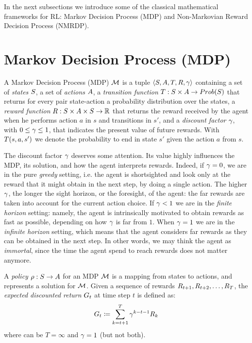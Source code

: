 In the next subsections we introduce some of the classical mathematical frameworks for RL: Markov Decision Process (MDP) and Non-Markovian Reward Decision Process (NMRDP).
\section{Markov Decision Process (MDP)}
\label{MDP}

A Markov Decision Process (MDP) $\mathcal{M}$ is a tuple $\langle S, A, T, R, \gamma \rangle$ containing a set of \emph{states} $S$, a set of \emph{actions} $A$, a \emph{transition function} $T: S \times A \to Prob(S)$ that returns for every pair state-action a probability distribution over the states, a \emph{reward function} $R: S \times A \times S \to \mathbb{R}$ that returns the reward received by the agent when he performs action $a$ in $s$ and transitions in $s'$, and a \emph{discount factor} $\gamma$, with $0 \le \gamma \le 1$, that indicates the present value of future rewards. With $T(s, a, s')$ we denote the probability to end in state $s'$ given the action $a$ from $s$.

The discount factor $\gamma$ deserves some attention. Its value highly influences the MDP, its solution, and how the agent interprets rewards. Indeed, if $\gamma = 0$, we are in the pure \emph{greedy} setting, i.e. the agent is shortsighted and look only at the reward that it might obtain in the next step, by doing a single action. The higher $\gamma$, the longer the sight horizon, or the foresight, of the agent: the far rewards are taken into account for the  current action choice. If $\gamma < 1$ we are in the \emph{finite horizon} setting: namely, the agent is intrinsically motivated to obtain rewards as fast as possible, depending on how $\gamma$ is far from $1$. When $\gamma = 1$ we are in the \emph{infinite horizon} setting, which means that the agent considers far rewards as they can be obtained in the next step. In other words, we may think the agent as \emph{immortal}, since the time the agent spend to reach rewards does not matter anymore.

\medskip
A \emph{policy} $\rho: S \to A$ for an MDP $\mathcal{M}$ is a mapping from states to actions, and represents a solution for $\mathcal{M}$. Given a sequence of rewards $R_{t+1}, R_{t+2}, \dots, R_{T}$, the \emph{expected discounted return} $G_t$ at time step $t$
is defined as: 
\begin{equation}\label{def:expected-discounted-return}
G_t \coloneqq \sum_{k=t+1}^T \gamma^{k-t-1}R_k
\end{equation} where can be $T = \infty$ and $\gamma = 1$ (but not both). 

